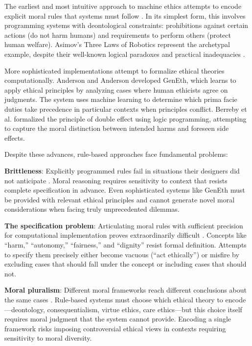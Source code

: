 \documentclass[12pt]{article}
\begin{document}
The earliest and most intuitive approach to machine ethics attempts to encode explicit moral rules that systems must follow \citep{asimov1950robot, gips1995towards}. In its simplest form, this involves programming systems with deontological constraints: prohibitions against certain actions (do not harm humans) and requirements to perform others (protect human welfare). Asimov's Three Laws of Robotics represent the archetypal example, despite their well-known logical paradoxes and practical inadequacies \citep{asimov1950robot, clarke2009asimov}.

More sophisticated implementations attempt to formalize ethical theories computationally. Anderson and Anderson \citep{anderson2008geneth, anderson2011machine} developed GenEth, which learns to apply ethical principles by analyzing cases where human ethicists agree on judgments. The system uses machine learning to determine which prima facie duties take precedence in particular contexts when principles conflict. Berreby et al. \citep{berreby2015modelling} formalized the principle of double effect using logic programming, attempting to capture the moral distinction between intended harms and foreseen side effects.

Despite these advances, rule-based approaches face fundamental problems:

\textbf{Brittleness}: Explicitly programmed rules fail in situations their designers did not anticipate \citep{bryson2018patiency}. Moral reasoning requires sensitivity to context that resists complete specification in advance. Even sophisticated systems like GenEth must be provided with relevant ethical principles and cannot generate novel moral considerations when facing truly unprecedented dilemmas.

\textbf{The specification problem}: Articulating moral rules with sufficient precision for computational implementation proves extraordinarily difficult \citep{dennis2016formal, etzioni2017incorporating}. Concepts like ``harm,'' ``autonomy,'' ``fairness,'' and ``dignity'' resist formal definition. Attempts to specify them precisely either become vacuous (``act ethically'') or misfire by excluding cases that should fall under the concept or including cases that should not.

\textbf{Moral pluralism}: Different moral frameworks reach different conclusions about the same cases \citep{beauchamp2001principles}. Rule-based systems must choose which ethical theory to encode---deontology, consequentialism, virtue ethics, care ethics---but this choice itself requires moral judgment that the system cannot provide. Encoding a single framework risks imposing controversial ethical views in contexts requiring sensitivity to moral diversity.
\end{document}
